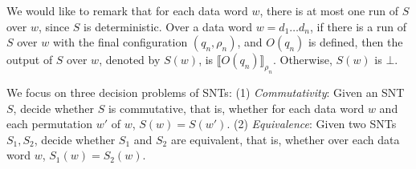 \documentclass[runningheads,a4paper]{llncs}
\newcommand{\eval}[2]{\llbracket#1\rrbracket_{#2}}
\begin{document}
We would like to remark that for each data word $w$, there is at most one run of $S$ over $w$, since $S$ is deterministic. 
Over a data word $w = d_1 \dots d_n$, if there is a run of $S$ over $w$ with the final configuration $(q_n,\rho_n)$, and $O(q_n)$ is defined, then the output of $S$ over $w$, denoted by ${S}(w)$, is $\eval{O(q_n)}{\rho_n}$. Otherwise, ${S}(w)$ is $\bot$.

We focus on three decision problems of SNTs: (1) \emph{Commutativity}: Given an SNT $S$, decide whether $S$ is commutative, that is, whether for each data word $w$ and each permutation $w'$ of $w$, $S(w)=S(w')$. (2) \emph{Equivalence}: Given two SNTs $S_1,S_2$, decide whether $S_1$ and $S_2$ are equivalent, that is, whether over each data word $w$, $S_1(w)=S_2(w)$.


\end{document}
